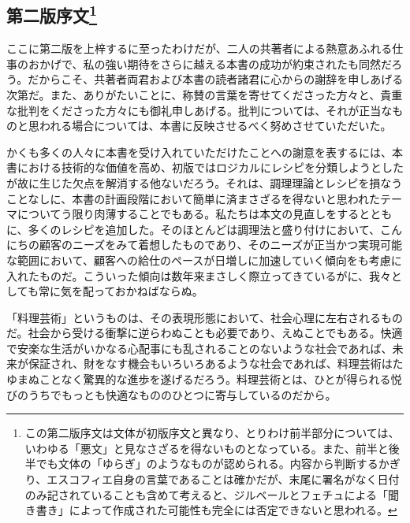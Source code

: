 \newpage

\begin{main}

\hypertarget{introduction-deuxieme-edition}{%
\section[第二版序文]{\texorpdfstring{第二版序文\footnote{この第二版序文は文体が初版序文と異なり、とりわけ前半部分については、いわゆる「悪文」と見なさざるを得ないものとなっている。また、前半と後半でも文体の「ゆらぎ」のようなものが認められる。内容から判断するかぎり、エスコフィエ自身の言葉であることは確かだが、末尾に署名がなく日付のみ記されていることも含めて考えると、ジルベールとフェチュによる「聞き書き」によって作成された可能性も完全には否定できないと思われる。}}{第二版序文}}\label{introduction-deuxieme-edition}}

\normalsize
{}
\vspace*{1\zw}

ここに第二版を上梓するに至ったわけだが、二人の共著者による熱意あふれる仕事のおかげで、私の強い期待をさらに越える本書の成功が約束されたも同然だろう。だからこそ、共著者両君および本書の読者諸君に心からの謝辞を申しあげる次第だ。また、ありがたいことに、称賛の言葉を寄せてくださった方々と、貴重な批判をくださった方々にも御礼申しあげる。批判については、それが正当なものと思われる場合については、本書に反映させるべく努めさせていただいた。

かくも多くの人々に本書を受け入れていただけたことへの謝意を表するには、本書における技術的な価値を高め、初版ではロジカルにレシピを分類しようとしたが故に生じた欠点を解消する他ないだろう。それは、調理理論とレシピを損なうことなしに、本書の計画段階において簡単に済まさざるを得ないと思われたテーマについてう限り肉薄することでもある。私たちは本文の見直しをするとともに、多くのレシピを追加した。そのほとんどは調理法と盛り付けにおいて、こんにちの顧客のニーズをみて着想したものであり、そのニーズが正当かつ実現可能な範囲において、顧客への給仕のペースが日増しに加速していく傾向をも考慮に入れたものだ。こういった傾向は数年来まさしく際立ってきているがに、我々としても常に気を配っておかねばならぬ。

「料理芸術」というものは、その表現形態において、社会心理に左右されるものだ。社会から受ける衝撃に逆らわぬことも必要であり、えぬことでもある。快適で安楽な生活がいかなる心配事にも乱されることのないような社会であれば、未来が保証され、財をなす機会もいろいろあるような社会であれば、料理芸術はたゆまぬことなく驚異的な進歩を遂げるだろう。料理芸術とは、ひとが得られる悦びのうちでもっとも快適なもののひとつに寄与しているのだから。


\end{main}
